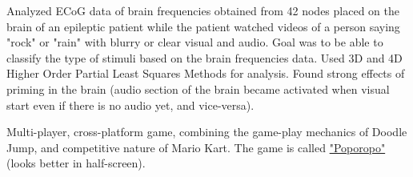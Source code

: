 \documentclass[letterpaper]{deedy-resume} %
\begin{document}
\begin{minipage}[t]{0.7\textwidth}

Analyzed ECoG data of brain frequencies obtained from 42 nodes placed on the brain of an epileptic patient while the patient watched videos of a person saying "rock" or "rain" with blurry or clear visual and audio. Goal was to be able to classify the type of stimuli based on the brain frequencies data. Used 3D and 4D Higher Order Partial Least Squares Methods for analysis. Found strong effects of priming in the brain (audio section of the brain became activated when visual start even if there is no audio yet, and vice-versa).

\sectionsep %



Multi-player, cross-platform game, combining the game-play mechanics of Doodle Jump, and competitive nature of Mario Kart. The game is called \href{http://poporopo.nimbusmog.com}{"Poporopo"} (looks better in half-screen).

\sectionsep %

\end{minipage} %

\end{document}
